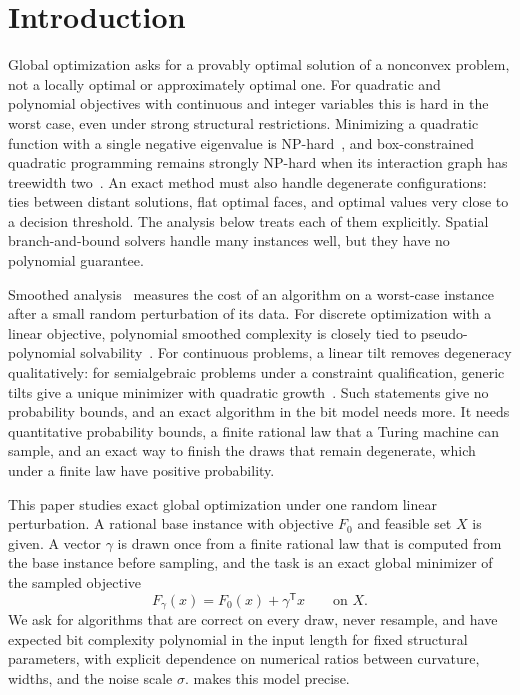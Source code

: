 \section{Introduction}\label{sec:intro}

Global optimization asks for a provably optimal solution of a nonconvex
problem, not a locally optimal or approximately optimal one. For quadratic
and polynomial objectives with continuous and integer variables this is hard
in the worst case, even under strong structural restrictions. Minimizing a
quadratic function with a single negative eigenvalue is
NP-hard~\citep{pardalos1991-quadratic-programming-with-one}, and box-constrained quadratic
programming remains strongly NP-hard when its interaction graph has
treewidth two~\citep{pia2026-treewidth-and-the-complexity-of}. An exact
method must also handle degenerate configurations: ties between distant
solutions, flat optimal faces, and optimal values very close to a decision
threshold. The analysis below treats each of them explicitly. Spatial
branch-and-bound solvers handle many instances well, but they have no
polynomial guarantee.

Smoothed analysis~\citep{spielman2004-smoothed-analysis-of-algorithms-why} measures the cost of an algorithm
on a worst-case instance after a small random perturbation of its data. For
discrete optimization with a linear objective, polynomial smoothed
complexity is closely tied to pseudo-polynomial
solvability~\citep{beier2006-typical-properties-of-winners-and,roglin2007-smoothed-analysis-of-integer-programming}.
For continuous problems, a linear tilt removes degeneracy qualitatively: for
semialgebraic problems under a constraint qualification, generic tilts give
a unique minimizer with quadratic
growth~\citep{lee2017-generic-properties-for-semialgebraic-programs}. Such
statements give no probability bounds, and an exact algorithm in the bit
model needs more. It needs quantitative probability bounds, a finite rational law
that a Turing machine can sample, and an exact way to finish the draws that
remain degenerate, which under a finite law have positive probability.

This paper studies exact global optimization under one random linear
perturbation. A rational base instance with objective $F_0$ and feasible set
$X$ is given. A vector $\gamma$ is drawn once from a finite rational law that
is computed from the base instance before sampling, and the task is an exact
global minimizer of the sampled objective
\[
 F_\gamma(x)=F_0(x)+\gamma^{\mathsf T}x\qquad\text{on }X .
\]
We ask for algorithms that are correct on every draw, never resample, and
have expected bit complexity polynomial in the input length for fixed
structural parameters, with explicit dependence on numerical ratios between
curvature, widths, and the noise scale $\sigma$.  makes this
model precise.

